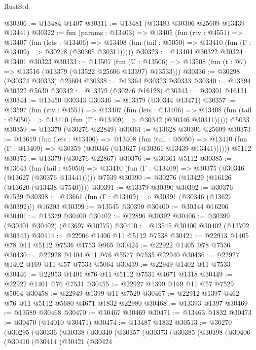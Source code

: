 \begin{lexlean}{RustStd}
\begin{coremodule}
@30306 := @13484 @1407
@30311 := @13481 (@13483 @30306 @25609 @13439 @13441)
@30322 := fun (params : @13403) =>
  @13405
    (fun (rty : @4551) =>
    @13407
      (fun (lets : @13406) =>
      @13408 (fun (tail : @5050) => @13410 (fun (Γ : @13409) => @30278 (@30305 @30311)))))
@30323 := @13404 @30322
@30324 := @13401 @30323
@30333 := @13507
    (fun (U : @13506) => @13508 (fun (t : @7) => @13516 (@13379 (@13522 @25606 @13397) @13533)))
@30336 := @30298 (@30324 @30333) @25604
@30338 := @13364 @30323 @30333
@30340 := @13594 @30322 @5630
@30342 := @13379 (@30276 @16128)
@30343 := @30301 @16131
@30344 := @13450 @30343
@30346 := @13379 (@30344 @13471)
@30357 := @13597
    (fun (rty : @4551) =>
    @13407
      (fun (lets : @13406) =>
      @13408 (fun (tail : @5050) => @13410 (fun (Γ : @13409) => @30342 (@30346 @30311)))))
    @5033
@30359 := @13379 (@30276 @22849)
@30361 := @13628 @30306 @25609
@30373 := @13619
    (fun (lets : @13406) =>
    @13408
      (fun (tail : @5050) =>
      @13410 (fun (Γ : @13409) => @30359 (@30346 (@13627 (@30361 @13439 @13441))))))
    @5112
@30375 := @13379 (@30276 @22867)
@30376 := @30361 @5112
@30385 := @13643
    (fun (tail : @5050) => @13410 (fun (Γ : @13409) => @30375 (@30346 (@13627 (@30376 @13441)))))
    @7539
@30390 := @30276 (@13429 (@16126 (@13620 (@13438 @7540))))
@30391 := @13379 @30390
@30392 := @30376 @7539
@30398 := @13661 (fun (Γ : @13409) => @30391 (@30346 (@13627 @30392))) @16203
@30399 := @13545 @30390
@30400 := @30344 @16206
@30401 := @13379 @30400
@30402 := @22896 @30392
@30406 := @30399 (@30401 @30402) (@13697 @30275)
@30410 := @13545 @30400 @30402 (@13702 @30343)
@30414 := @22906 @1406 @11 @5112 @7538
@30421 := @22913 @1405 @78 @11 @5112 @7536 @4753 @965
@30424 := @22922 @1405 @78 @7536
@30430 := @22928 @1404 @11 @76 @5577 @7535 @22940
@30436 := @22927 @1402 @169 @11 @57 @7533 @5064
@30439 := @22949 @1402 @11 @7533
@30446 := @22953 @1401 @76 @11 @5112 @7531 @4671 @1318
@30449 := @22922 @1401 @76 @7531
@30455 := @22927 @1399 @169 @11 @57 @7529 @5064
@30458 := @22949 @1399 @11 @7529
@30467 := @22912 @1397 @462 @76 @11 @5112 @5680 @4671 @1832 @22980
@30468 := @13393 @1397
@30469 := @13589 @30468
@30470 := @30467 @30469
@30471 := @13463 @1832
@30473 := @30470 (@14010 @30471)
@30474 := @13487 @1832
@30513 := @30270
    (@30295
      (@30336
        (@30338
          (@30340
            (@30357
              (@30373
                (@30385
                  (@30398
                    (@30406
                      (@30410
                        (@30414
                          (@30421
                            (@30424

\end{coremodule}
\end{lexlean}
